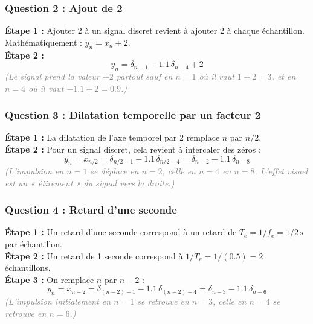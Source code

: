 \documentclass[12pt,a4paper]{article}
\newcommand{\step}[1]{\textcolor{coursbleu}{\textbf{Étape #1 :}}}
\newcommand{\explication}[1]{\textit{\textcolor{gray}{(#1)}}}
\begin{document}
\subsubsection*{Question 2 : Ajout de 2}

\begin{tcolorbox}[corrbox, title=Correction Q2]
\step{1} Ajouter 2 à un signal discret revient à ajouter 2 à chaque échantillon.
Mathématiquement : $y_n = x_n + 2$.\\[3pt]
\step{2}
\[
  y_n = \delta_{n-1} - 1.1\,\delta_{n-4} + 2
\]
\explication{Le signal prend la valeur $+2$ partout sauf en $n=1$ où il vaut $1+2=3$,
et en $n=4$ où il vaut $-1.1+2=0.9$.}
\end{tcolorbox}

\subsubsection*{Question 3 : Dilatation temporelle par un facteur 2}

\begin{tcolorbox}[corrbox, title=Correction Q3]
\step{1} La dilatation de l'axe temporel par 2 remplace $n$ par $n/2$.\\[3pt]
\step{2} Pour un signal discret, cela revient à intercaler des zéros :
\[
  y_n = x_{n/2} = \delta_{n/2 - 1} - 1.1\,\delta_{n/2-4} = \delta_{n-2} - 1.1\,\delta_{n-8}
\]
\explication{L'impulsion en $n=1$ se déplace en $n=2$, celle en $n=4$ en $n=8$.
L'effet visuel est un « étirement » du signal vers la droite.}
\end{tcolorbox}

\subsubsection*{Question 4 : Retard d'une seconde}

\begin{tcolorbox}[corrbox, title=Correction Q4]
\step{1} Un retard d'une seconde correspond à un retard de $T_e = 1/f_e = 1/2\,\text{s}$
par échantillon.\\[3pt]
\step{2} Un retard de 1 seconde correspond à $1/T_e = 1/(0.5) = 2$ échantillons.\\[3pt]
\step{3} On remplace $n$ par $n-2$ :
\[
  y_n = x_{n-2} = \delta_{(n-2)-1} - 1.1\,\delta_{(n-2)-4} = \delta_{n-3} - 1.1\,\delta_{n-6}
\]
\explication{L'impulsion initialement en $n=1$ se retrouve en $n=3$,
celle en $n=4$ se retrouve en $n=6$.}
\end{tcolorbox}
\end{document}
